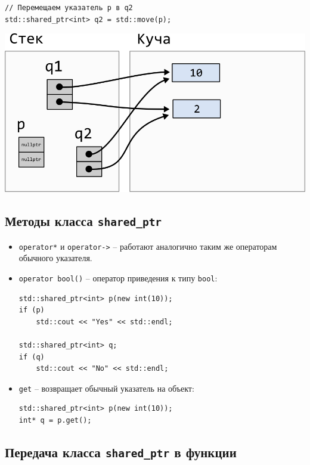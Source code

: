 \documentclass{article}
\begin{document}
\begin{minipage}{0.45\textwidth}
\begin{lstlisting}
// Перемещаем указатель p в q2
std::shared_ptr<int> q2 = std::move(p);
\end{lstlisting}
\end{minipage}
\begin{minipage}{0.5\textwidth}
\includegraphics[scale=1]{../images/shared_ptr3.png}
\end{minipage}



\subsection*{Методы класса \texttt{shared\_ptr}}
\begin{itemize}
\item \texttt{operator*} и \texttt{operator->} -- работают аналогично таким же операторам обычного указателя.

\item \texttt{operator bool()} -- оператор приведения к типу \texttt{bool}:
\begin{lstlisting}
std::shared_ptr<int> p(new int(10));
if (p) 
	std::cout << "Yes" << std::endl;
	
std::shared_ptr<int> q;
if (q) 
	std::cout << "No" << std::endl;
\end{lstlisting}


\item \texttt{get} -- возвращает обычный указатель на объект:
\begin{lstlisting}
std::shared_ptr<int> p(new int(10));
int* q = p.get();
\end{lstlisting}


\end{itemize}

\newpage
\subsection*{Передача класса \texttt{shared\_ptr} в функции}
\end{document}
